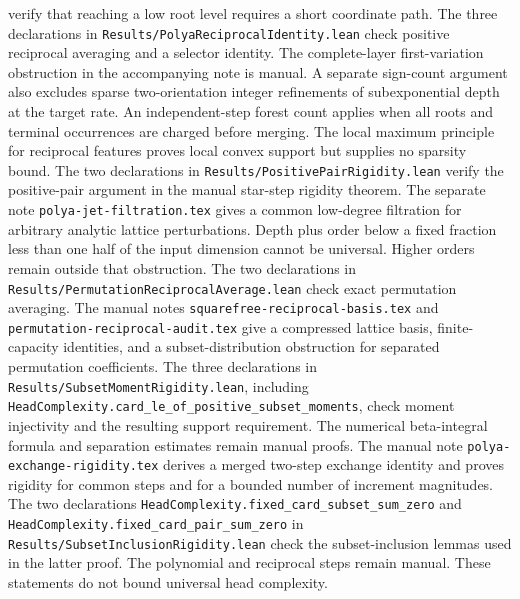 \documentclass[11pt]{article}
\begin{document}
verify that reaching a low root level requires a short coordinate path.
The three declarations in \texttt{Results/PolyaReciprocalIdentity.lean}
check positive reciprocal averaging and a selector identity. The
complete-layer first-variation obstruction in the accompanying note
is manual. A separate sign-count argument also excludes sparse
two-orientation integer refinements of subexponential depth at the
target rate. An independent-step forest count applies when all roots
and terminal occurrences are charged before merging. The local maximum principle for reciprocal features
proves local convex support but supplies no sparsity bound.
The two declarations in \texttt{Results/PositivePairRigidity.lean}
verify the positive-pair argument in the manual star-step rigidity theorem.
The separate note \texttt{polya-jet-filtration.tex} gives a common
low-degree filtration for arbitrary analytic lattice perturbations.
Depth plus order below a fixed fraction less than one half of the
input dimension cannot be universal. Higher orders remain outside
that obstruction.
The two declarations in \texttt{Results/PermutationReciprocalAverage.lean}
check exact permutation averaging. The manual notes
\texttt{squarefree-reciprocal-basis.tex} and
\texttt{permutation-reciprocal-audit.tex} give a compressed lattice
basis, finite-capacity identities, and a subset-distribution
obstruction for separated permutation coefficients. The three declarations
in \texttt{Results/SubsetMomentRigidity.lean}, including
\texttt{HeadComplexity.card\_le\_of\_positive\_subset\_moments},
check moment injectivity and the resulting support requirement.
The numerical beta-integral formula and separation estimates remain
manual proofs.
The manual note \texttt{polya-exchange-rigidity.tex} derives a merged
two-step exchange identity and proves rigidity for common steps and for
a bounded number of increment magnitudes. The two declarations \texttt{HeadComplexity.fixed\_card\_subset\_sum\_zero}
and \texttt{HeadComplexity.fixed\_card\_pair\_sum\_zero} in
\texttt{Results/SubsetInclusionRigidity.lean} check the subset-inclusion
lemmas used in the latter proof. The polynomial and reciprocal steps
remain manual. These statements do not bound universal head complexity.
\end{document}
